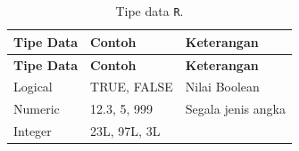 \documentclass[12pt,]{krantz}
\begin{document}
\begin{longtable}[]{@{}lll@{}}
\caption{\label{tab:tipedata} Tipe data \texttt{R}.}\tabularnewline
\toprule
\begin{minipage}[b]{0.11\columnwidth}\raggedright
\textbf{Tipe Data}\strut
\end{minipage} & \begin{minipage}[b]{0.19\columnwidth}\raggedright
\textbf{Contoh}\strut
\end{minipage} & \begin{minipage}[b]{0.61\columnwidth}\raggedright
\textbf{Keterangan}\strut
\end{minipage}\tabularnewline
\midrule
\endfirsthead
\toprule
\begin{minipage}[b]{0.11\columnwidth}\raggedright
\textbf{Tipe Data}\strut
\end{minipage} & \begin{minipage}[b]{0.19\columnwidth}\raggedright
\textbf{Contoh}\strut
\end{minipage} & \begin{minipage}[b]{0.61\columnwidth}\raggedright
\textbf{Keterangan}\strut
\end{minipage}\tabularnewline
\midrule
\endhead
\begin{minipage}[t]{0.11\columnwidth}\raggedright
Logical\strut
\end{minipage} & \begin{minipage}[t]{0.19\columnwidth}\raggedright
TRUE, FALSE\strut
\end{minipage} & \begin{minipage}[t]{0.61\columnwidth}\raggedright
Nilai Boolean\strut
\end{minipage}\tabularnewline
\begin{minipage}[t]{0.11\columnwidth}\raggedright
Numeric\strut
\end{minipage} & \begin{minipage}[t]{0.19\columnwidth}\raggedright
12.3, 5, 999\strut
\end{minipage} & \begin{minipage}[t]{0.61\columnwidth}\raggedright
Segala jenis angka\strut
\end{minipage}\tabularnewline
\begin{minipage}[t]{0.11\columnwidth}\raggedright
Integer\strut
\end{minipage} & \begin{minipage}[t]{0.19\columnwidth}\raggedright
23L, 97L, 3L\strut
\end{minipage} & \begin{minipage}[t]{0.61\columnwidth}\raggedright

\end{minipage}
\end{longtable}
\end{document}
